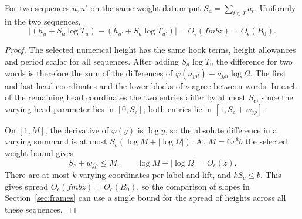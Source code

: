 \begin{lemma}\label{lem:division-height-spread}
For two sequences \(u,u'\) on the same weight datum put
\(S_a=\sum_{t\in T}a_t\). Uniformly in the two sequences,
\[
 \big|(h_u+S_a\log T_u)-(h_{u'}+S_a\log T_{u'})\big|
              =O_\epsilon(fmbz)=O_\epsilon(B_0).
\]
\end{lemma}

\begin{proof}
The selected numerical height has the same hook terms,
height allowances and period scalar for all sequences.
After adding \(S_a\log T_u\) the difference for two words
is therefore the sum of the differences of
\(\varphi(\nu_{j\rho i})-\nu_{j\rho i}\log\Omega\).
The first and last head coordinates and the lower blocks
of \(\nu\) agree between words. In each of the remaining
head coordinates the two entries differ by at most \(S_c\),
since the varying head parameter lies in \([0,S_c]\);
both entries lie in \([1,S_c+w_{j\rho}]\).

On \([1,M]\), the derivative of \(\varphi(y)\) is
\(\log y\), so the absolute difference in a varying
summand is at most \(S_c(\log M+|\log\Omega|)\).
At \(M=6x^6 b\) the selected weight bound gives
\[
 S_c+w_{j\rho}\le M,\qquad \log M+|\log\Omega|=O_\epsilon(z).
\]
There are at most \(k\) varying coordinates per label
and lift, and \(kS_c\le b\).
This gives spread \(O_\epsilon(fmbz)=O_\epsilon(B_0)\),
so the comparison of slopes in Section~\ref{sec:frames} can use a single bound for the spread of heights across all these sequences.
\label{cor:word-division-9}
\end{proof}


